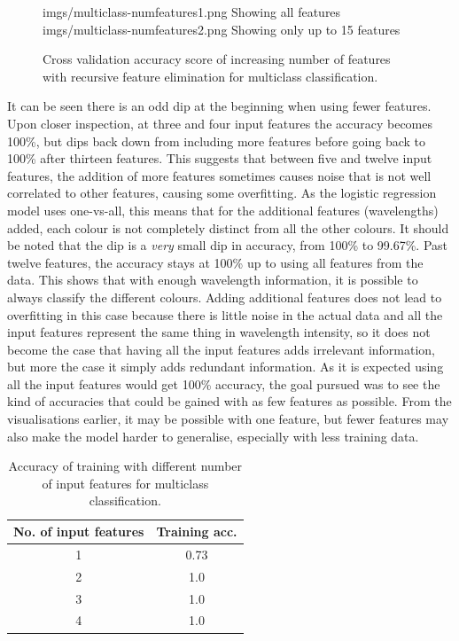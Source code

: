 \documentclass{article}
\begin{document}
\begin{figure}[H]
\centering
{}
{imgs/multiclass-numfeatures1.png}
{Showing all features}
\hspace*{\fill}
{imgs/multiclass-numfeatures2.png}
{Showing only up to 15 features}
\caption{Cross validation accuracy score of increasing number of features with recursive feature elimination for multiclass classification.}
\end{figure}
\noindent
It can be seen there is an odd dip at the beginning when using fewer features. Upon closer inspection, at three and four input features the accuracy becomes 100\%, but dips back down from including more features before going back to 100\% after thirteen features. This suggests that between five and twelve input features, the addition of more features sometimes causes noise that is not well correlated to other features, causing some overfitting. As the logistic regression model uses one-vs-all, this means that for the additional features (wavelengths) added, each colour is not completely distinct from all the other colours. It should be noted that the dip is a \textit{very} small dip in accuracy, from 100\% to 99.67\%. Past twelve features, the accuracy stays at 100\% up to using all features from the data. This shows that with enough wavelength information, it is possible to always classify the different colours. Adding additional features does not lead to overfitting in this case because there is little noise in the actual data and all the input features represent the same thing in wavelength intensity, so it does not become the case that having all the input features adds irrelevant information, but more the case it simply adds redundant information. 
\n
As it is expected using all the input features would get 100\% accuracy, the goal pursued was to see the kind of accuracies that could be gained with as few features as possible. From the visualisations earlier, it may be possible with one feature, but fewer features may also make the model harder to generalise, especially with less training data. 
\begin{table}[H]
\centering
\begin{tabular}{| c | c |}
\hline
\textbf{No. of input features} & \textbf{Training acc.} \\
\hline
1 & 0.73 \\
\hline
2 & 1.0 \\
\hline
3 & 1.0 \\
\hline
4 & 1.0 \\
\hline
\end{tabular}
\caption{Accuracy of training with different number of input features for multiclass classification.}
\end{table} 
\end{document}
